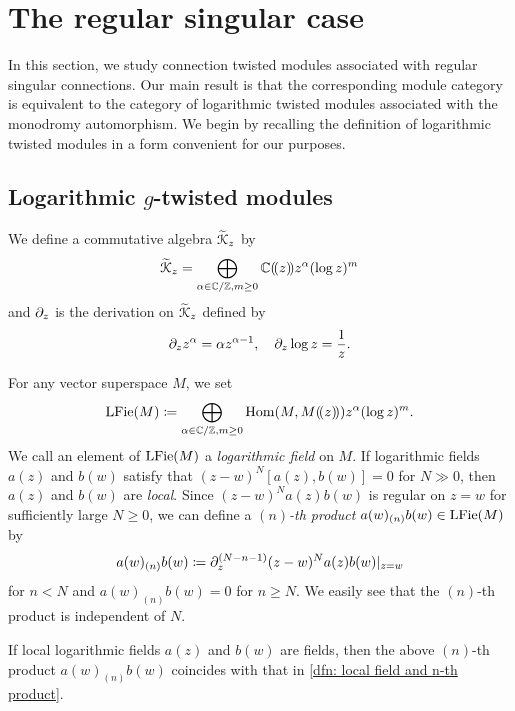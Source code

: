 \documentclass[final,reqno]{amsart}
\begin{document}
\section{The regular singular case}\label{s:regular singular case}

In this section, we study connection twisted modules associated with regular singular connections. Our main result is that the corresponding module category is equivalent to the category of logarithmic twisted modules associated with the monodromy automorphism. We begin by recalling the definition of logarithmic twisted modules \cite{Hua10,Bak16} in a form convenient for our purposes.

\subsection{Logarithmic $g$-twisted modules}

    We define a commutative algebra $\widetilde{\EuScript{K}}_z$ by
    \[
        \widetilde{\EuScript{K}}_z=\bigoplus_{\alpha\in\mathbb{C}/\mathbb{Z},m\geq 0}\mathbb{C}(\!( z )\!)z^\alpha(\log z)^m
    \]
    and $\partial_z$ is the derivation on $\widetilde{\EuScript{K}}_z$ defined by
    \[
        \partial_zz^{\alpha}=\alpha z^{\alpha-1},\quad \partial_z\log z=\frac{1}{z}.
    \]

    
\begin{dfn}
    For any vector superspace $M$, we set 
    \[
        \operatorname{LFie}(M)\coloneqq \bigoplus_{\alpha\in\mathbb{C}/\mathbb{Z},m\geq 0}\operatorname{Hom}(M,M(\!( z )\!))z^{\alpha}(\log z)^m.
    \]
    We call an element of $\operatorname{LFie}(M)$ a \emph{logarithmic field} on $M$. If logarithmic fields $a(z)$ and $b(w)$ satisfy that $(z-w)^N[a(z),b(w)]=0$ for $N\gg 0$, then $a(z)$ and $b(w)$ are \emph{local}. Since $(z-w)^Na(z)b(w)$ is regular on $z=w$ for sufficiently large $N\geq 0$, we can define a \emph{$(n)$-th product} $a(w)_{(n)}b(w)\in\operatorname{LFie}(M)$ by
    \[
        a(w)_{(n)}b(w)\coloneqq \partial_z^{(N-n-1)}(z-w)^Na(z)b(w)|_{z=w}
    \]
    for $n<N$ and $a(w)_{(n)}b(w)=0$ for $n\geq N$. We easily see that the $(n)$-th product is independent of $N$.
\end{dfn}

\begin{rmk}
    If local logarithmic fields $a(z)$ and $b(w)$ are fields, then the above $(n)$-th product $a(w)_{(n)}b(w)$ coincides with that in \cref{dfn: local field and n-th product}.
\end{rmk}
\end{document}
